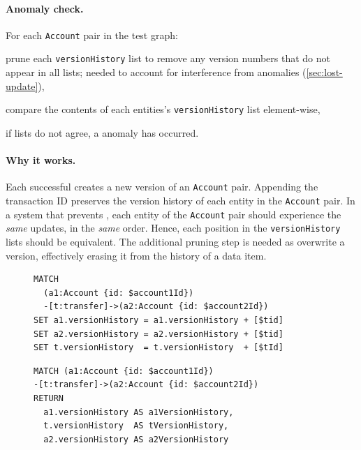 \paragraph{Anomaly check.}
For each \texttt{Account} pair in the test graph:
\begin{enumerate*}[label={(\roman*)}]
  \item prune each \texttt{versionHistory} list to remove any version numbers 
        that do not appear in all lists; needed to account for interference from
         anomalies (\autoref{sec:lost-update}),
  \item compare the contents of each entities's \texttt{versionHistory} list
        element-wise,
  \item if lists do not agree, a  anomaly has occurred.

\end{enumerate*}

\paragraph{Why it works.}
Each successful  creates a new version of an 
\texttt{Account} pair. Appending the transaction ID preserves the version 
history of each entity in the \texttt{Account} pair. In a system that prevents 
, each entity of the \texttt{Account} pair should experience the 
\emph{same} updates, in the \emph{same} order. Hence, each position in the 
\texttt{versionHistory} lists should be equivalent. The additional pruning step 
is needed as  overwrite a version, effectively erasing it 
from the history of a data item.

\begin{figure}[htb]
  \centering
  \begin{minipage}{0.53\linewidth}
\begin{lstlisting}[language=cypher,label=fig:dw1,caption=\tx{Dirty Write (G0) $T_\mathrm{W}$}.]
MATCH
  (a1:Account {id: $account1Id})
  -[t:transfer]->(a2:Account {id: $account2Id})
SET a1.versionHistory = a1.versionHistory + [$tid]
SET a2.versionHistory = a2.versionHistory + [$tid]
SET t.versionHistory  = t.versionHistory  + [$tId]
\end{lstlisting}
\end{minipage}
\quad
\begin{minipage}{0.431\linewidth}
\begin{lstlisting}[language=cypher,label=fig:dw2,caption=\tx{Dirty Write (G0) $T_\mathrm{R}$}.]
MATCH (a1:Account {id: $account1Id})
-[t:transfer]->(a2:Account {id: $account2Id})
RETURN
  a1.versionHistory AS a1VersionHistory,
  t.versionHistory  AS tVersionHistory,
  a2.versionHistory AS a2VersionHistory
\end{lstlisting}
\end{minipage}
\end{figure}

